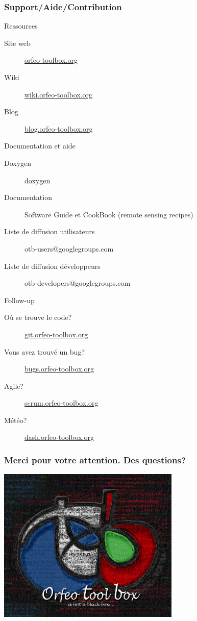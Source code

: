 \documentclass[8pt]{beamer}
\begin{document}
\begin{frame}
\frametitle{Support/Aide/Contribution}
\vspace{-0.2cm}
\begin{block}{Ressources}
\vspace{-0.2cm}
\begin{description}
\item[Site web] \href{http://www.orfeo-toolbox.org}{orfeo-toolbox.org}
\item[Wiki] \href{http://wiki.orfeo-toolbox.org}{wiki.orfeo-toolbox.org}
\item[Blog] \href{http://blog.orfeo-toolbox.org}{blog.orfeo-toolbox.org}
\end{description}
\end{block}
\vspace{-0.2cm}
\begin{block}{Documentation et aide}
\vspace{-0.2cm}
\begin{description}
\item[Doxygen] \href{http://www.orfeo-toolbox.org/doxygen/}{doxygen}
\item[Documentation] Software Guide et CookBook (remote sensing recipes)
\item[Liste de diffusion utilisateurs] otb-users@googlegroups.com
\item[Liste de diffusion développeurs] otb-developers@googlegroups.com
\end{description}
\end{block}
\vspace{-0.2cm}
\begin{block}{Follow-up}
\vspace{-0.2cm}
\begin{description}
\item[Où se trouve le code?] \href{http://git.orfeo-toolbox.org}{git.orfeo-toolbox.org}
\item[Vous avez trouvé un bug?] \href{http://bugs.orfeo-toolbox.org}{bugs.orfeo-toolbox.org}
\item[Agile?] \href{http://scrum.orfeo-toolbox.org}{scrum.orfeo-toolbox.org}
\item[Météo?] \href{http://dash.orfeo-toolbox.org}{dash.orfeo-toolbox.org}
\end{description}
\end{block}
\end{frame}

\begin{frame}
\frametitle{Merci pour votre attention. Des questions?}
\begin{minipage}[t][6cm][t]{\textwidth}
\begin{center}
\includegraphics[width=0.65\textwidth]{images/LOGOTB_blackbox.png}
\end{center}
\end{minipage}
\end{frame}
\end{document}
